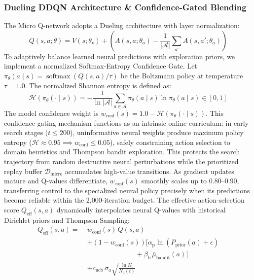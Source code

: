 \subsubsection{Dueling DDQN Architecture \& Confidence-Gated Blending}
The Micro Q-network adopts a Dueling architecture \cite{wang2016dueling} with layer normalization:
\begin{equation}
  Q(s, a; \theta) = V(s; \theta_v) + \left( A(s, a; \theta_a) - \frac{1}{|\mathcal{A}|} \sum_{a'} A(s, a'; \theta_a) \right)
  \label{eq:dueling_q}
\end{equation}
To adaptively balance learned neural predictions with exploration priors, we implement a normalized Softmax-Entropy Confidence Gate. Let $\pi_{\theta}(a \mid s) = \operatorname{softmax}(Q(s, a)/\tau)$ be the Boltzmann policy at temperature $\tau = 1.0$. The normalized Shannon entropy is defined as:
\begin{equation}
  \mathcal{H}(\pi_{\theta}(\cdot \mid s)) = -\frac{1}{\ln |\mathcal{A}|} \sum_{a \in \mathcal{A}} \pi_{\theta}(a \mid s) \ln \pi_{\theta}(a \mid s) \in [0, 1]
  \label{eq:policy_entropy}
\end{equation}
The model confidence weight is $w_{\text{conf}}(s) = 1.0 - \mathcal{H}(\pi_{\theta}(\cdot \mid s))$. This confidence gating mechanism functions as an intrinsic online curriculum: in early search stages ($t \le 200$), uninformative neural weights produce maximum policy entropy ($\mathcal{H} \approx 0.95 \implies w_{\text{conf}} \le 0.05$), safely constraining action selection to domain heuristics and Thompson bandit exploration. This protects the search trajectory from random destructive neural perturbations while the prioritized replay buffer $\mathcal{D}_{\text{micro}}$ accumulates high-value transitions. As gradient updates mature and Q-values differentiate, $w_{\text{conf}}(s)$ smoothly scales up to $0.80\text{--}0.90$, transferring control to the specialized neural policy precisely when its predictions become reliable within the 2,000-iteration budget. The effective action-selection score $Q_{\text{eff}}(s, a)$ dynamically interpolates neural Q-values with historical Dirichlet priors and Thompson Sampling:
\begin{align}
  Q_{\text{eff}}(s, a) = \; &w_{\text{conf}}(s)\,Q(s, a) \nonumber \\
  &+ (1 - w_{\text{conf}}(s))\Big[ \alpha_{\text{p}}\ln(P_{\text{prior}}(a) + \epsilon) \nonumber \\
  &\qquad\qquad\qquad\quad + \beta_{\text{b}}\,\bar{\mu}_{\text{bandit}}(a) \Big] \nonumber \\
  &+ c_{\text{ucb}}\,\sigma_a \sqrt{\frac{\ln N_t}{N_a(t)}}
  \label{eq:q_eff_blending}
\end{align}
